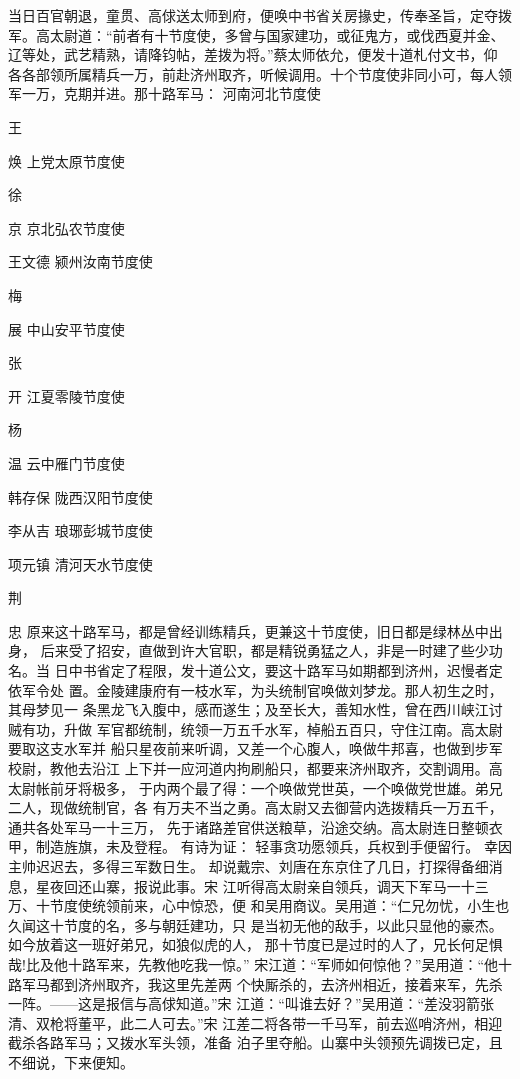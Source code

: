 当日百官朝退，童贯、高俅送太师到府，便唤中书省关房掾史，传奉圣旨，定夺拨
军。高太尉道：“前者有十节度使，多曾与国家建功，或征鬼方，或伐西夏并金、
辽等处，武艺精熟，请降钧帖，差拨为将。”蔡太师依允，便发十道札付文书，仰
各各部领所属精兵一万，前赴济州取齐，听候调用。十个节度使非同小可，每人领
军一万，克期并进。那十路军马：
河南河北节度使

王

焕
上党太原节度使

徐

京
京北弘农节度使

王文德
颍州汝南节度使

梅

展
中山安平节度使

张

开
江夏零陵节度使

杨

温
云中雁门节度使

韩存保
陇西汉阳节度使

李从吉
琅琊彭城节度使

项元镇
清河天水节度使

荆

忠
原来这十路军马，都是曾经训练精兵，更兼这十节度使，旧日都是绿林丛中出身，
后来受了招安，直做到许大官职，都是精锐勇猛之人，非是一时建了些少功名。当
日中书省定了程限，发十道公文，要这十路军马如期都到济州，迟慢者定依军令处
置。金陵建康府有一枝水军，为头统制官唤做刘梦龙。那人初生之时，其母梦见一
条黑龙飞入腹中，感而遂生；及至长大，善知水性，曾在西川峡江讨贼有功，升做
军官都统制，统领一万五千水军，棹船五百只，守住江南。高太尉要取这支水军并
船只星夜前来听调，又差一个心腹人，唤做牛邦喜，也做到步军校尉，教他去沿江
上下并一应河道内拘刷船只，都要来济州取齐，交割调用。高太尉帐前牙将极多，
于内两个最了得：一个唤做党世英，一个唤做党世雄。弟兄二人，现做统制官，各
有万夫不当之勇。高太尉又去御营内选拨精兵一万五千，通共各处军马一十三万，
先于诸路差官供送粮草，沿途交纳。高太尉连日整顿衣甲，制造旌旗，未及登程。
有诗为证：
轻事贪功愿领兵，兵权到手便留行。
幸因主帅迟迟去，多得三军数日生。
却说戴宗、刘唐在东京住了几日，打探得备细消息，星夜回还山寨，报说此事。宋
江听得高太尉亲自领兵，调天下军马一十三万、十节度使统领前来，心中惊恐，便
和吴用商议。吴用道：“仁兄勿忧，小生也久闻这十节度的名，多与朝廷建功，只
是当初无他的敌手，以此只显他的豪杰。如今放着这一班好弟兄，如狼似虎的人，
那十节度已是过时的人了，兄长何足惧哉!比及他十路军来，先教他吃我一惊。”
宋江道：“军师如何惊他？”吴用道：“他十路军马都到济州取齐，我这里先差两
个快厮杀的，去济州相近，接着来军，先杀一阵。——这是报信与高俅知道。”宋
江道：“叫谁去好？”吴用道：“差没羽箭张清、双枪将董平，此二人可去。”宋
江差二将各带一千马军，前去巡哨济州，相迎截杀各路军马；又拨水军头领，准备
泊子里夺船。山寨中头领预先调拨已定，且不细说，下来便知。

